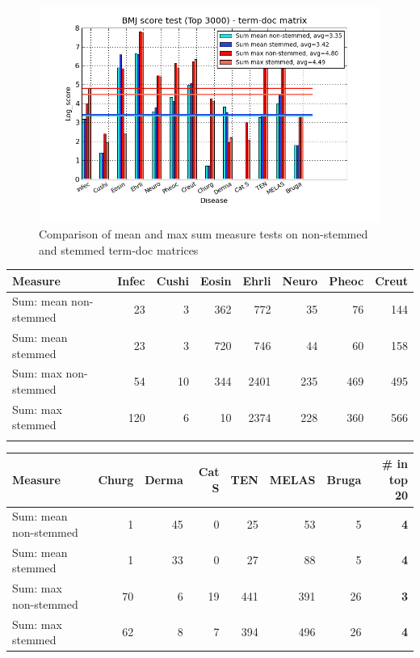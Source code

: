 \begin{figure}[H]
  \caption{Comparison of mean and max sum measure tests on non-stemmed and stemmed term-doc matrices}
  \begin{center}
    \includegraphics[width=1.2\textwidth]{barcharts/termDoc_bmj_hist_3000_ns_s_mea_max_sum.png}
  \end{center}
  \label{termDoc_bmj_hist_3000_ns_s_mea_max_sum}
\end{figure} 

\begin{table}[H]
  \begin{tiny}
    \begin{tabular}{|l|r|r|r|r|r|r|r|}
      \hline
      Measure &Infec&Cushi&Eosin&Ehrli&Neuro&Pheoc&Creut \\
      \hline
      Sum: mean non-stemmed &23&3&362&772&35&76&144 \\
      \hline
      Sum: mean stemmed &23&3&720&746&44&60&158 \\
      \hline
      Sum: max non-stemmed &54&10&344&2401&235&469&495 \\
      \hline
      Sum: max stemmed &120&6&10&2374&228&360&566 \\
      \hline
      \multicolumn{8}{c}{} \\
    \end{tabular}
    \begin{tabular}{|l|r|r|r|r|r|r|r|}
      \hline
      Measure &Churg&Derma&Cat S&TEN&MELAS&Bruga& \scriptsize{\textbf{\# in top 20}} \\
      \hline
      Sum: mean non-stemmed &1&45&0&25&53&5 &\scriptsize{\textbf{4}} \\
      \hline
      Sum: mean stemmed &1&33&0&27&88&5 &\scriptsize{\textbf{4}}\\
      \hline
      Sum: max non-stemmed &70&6&19&441&391&26 & \scriptsize{\textbf{3}} \\
      \hline
      Sum: max stemmed &62&8&7&394&496&26 & \scriptsize{\textbf{4}} \\
      \hline
    \end{tabular}
  \end{tiny}
\end{table}

